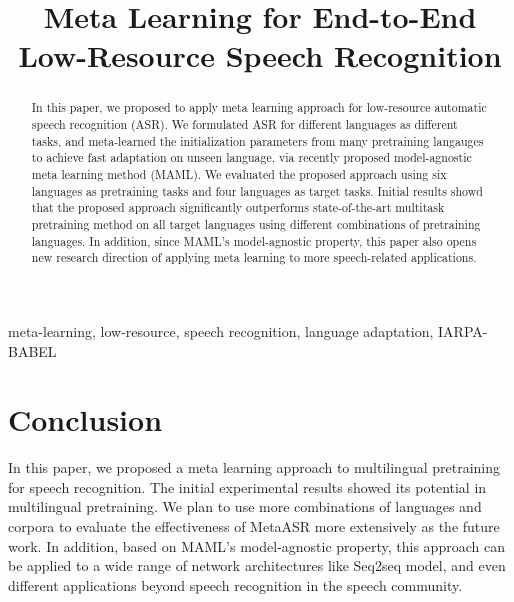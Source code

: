 \documentclass{article}
\title{Meta Learning for End-to-End Low-Resource Speech Recognition}
\begin{document}
%
\maketitle
%
\begin{abstract}
  In this paper, we proposed to apply meta learning approach for low-resource automatic speech recognition (ASR). We formulated ASR for different languages as different tasks, and meta-learned the initialization parameters from many pretraining langauges to achieve fast adaptation on unseen language, via recently proposed model-agnostic meta learning method (MAML). We evaluated the proposed approach using six languages as pretraining tasks and four languages as target tasks. Initial results showd that the proposed approach significantly outperforms state-of-the-art multitask pretraining method on all target languages using different combinations of pretraining languages. In addition, since MAML's model-agnostic property, this paper also opens new research direction of applying meta learning to more speech-related applications.
\end{abstract}
%
\begin{keywords}
  meta-learning, low-resource, speech recognition, language adaptation, IARPA-BABEL
\end{keywords}
%




%

\section{Conclusion}
\label{sec:conclusion}
In this paper, we proposed a meta learning approach to multilingual pretraining for speech recognition. The initial experimental results showed its potential in multilingual pretraining. We plan to use more combinations of languages and corpora to evaluate the effectiveness of MetaASR more extensively as the future work. In addition, based on MAML's model-agnostic property, this approach can be applied to a wide range of network architectures like Seq2seq model, and even different applications beyond speech recognition in the speech community.



\end{document}
